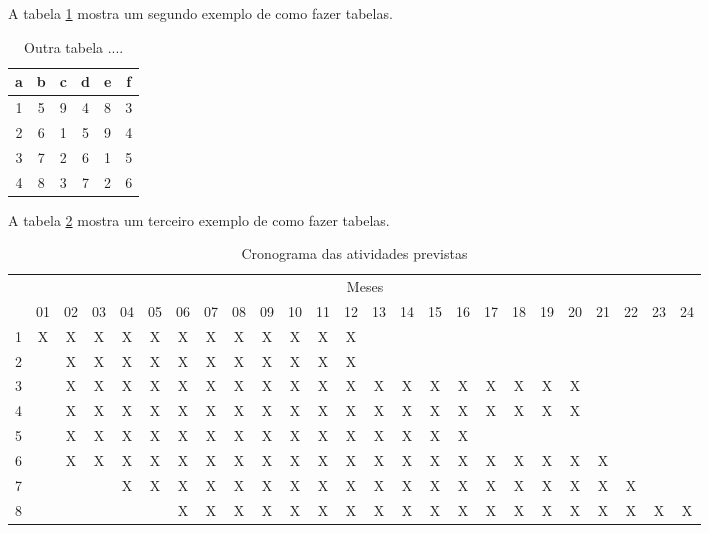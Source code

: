 A tabela \ref{tab2} mostra um segundo exemplo de como fazer tabelas.

\begin{table}[h]
  \centering
    \begin{tabular}{cccccc}\hline
    a & b & c & d & e & f \\\hline\hline
    1 & 5 & 9 & 4 & 8 & 3 \\\hline
    2 & 6 & 1 & 5 & 9 & 4 \\\hline
    3 & 7 & 2 & 6 & 1 & 5 \\\hline
    4 & 8 & 3 & 7 & 2 & 6 \\\hline
    \end{tabular}
    \caption{Outra tabela ....}\label{tab2}
\end{table}

A tabela \ref{tab3} mostra um terceiro exemplo de como fazer tabelas.

\begin{table}[!htpb]
\centering

\begin{small}
\setlength{\tabcolsep}{3pt}
\begin{tabular}{|c|c|c|c|c|c|c|c|c|c|c|c|c|c|c|c|c|c|c|c|c|c|c|c|c|}\hline
 & \multicolumn{24}{c|}{Meses}\\ \cline{2-25}
\raisebox{1.5ex}{Etapa} & 01 & 02 & 03 & 04 & 05 & 06 & 07 & 08 & 09 & 10 & 11 & 12 & 13 & 14 & 15 & 16 & 17 & 18 & 19 & 20 & 21 & 22 & 23 & 24 \\ \hline
1 & X & X & X & X & X & X & X & X & X & X & X & X & & & & & & & & & & & & \\ \hline
2 & & X & X & X & X & X & X & X & X & X & X & X & & & & & & & & & & & & \\ \hline
3 & & X & X & X & X & X & X & X & X & X & X & X & X & X & X & X & X & X & X & X & & & & \\ \hline
4 & & X & X & X & X & X & X & X & X & X & X & X & X & X & X & X & X & X & X & X & & & & \\ \hline
5 & & X & X & X & X & X & X & X & X & X & X & X & X & X & X & X & & & & & & & & \\ \hline
6 & & X & X & X & X & X & X & X & X & X & X & X & X & X & X & X & X & X & X & X & X & & & \\ \hline
7 & & & & X & X & X & X & X & X & X & X & X & X & X & X & X & X & X & X & X & X & X & & \\ \hline
8 & & & & & & X & X & X & X & X & X & X & X & X & X & X & X & X & X & X & X & X & X & X \\ \hline
\end{tabular}
\end{small}
\caption{Cronograma das atividades previstas}
\label{tab3}
\end{table} 

